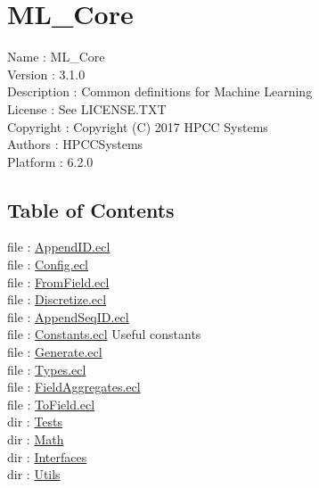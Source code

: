 \chapter*{ML\_Core}
\hypertarget{ecldoc:toc:ML_Core}{}

Name : ML\_Core \\
Version : 3.1.0 \\
Description : Common definitions for Machine Learning \\
License : See LICENSE.TXT \\
Copyright : Copyright (C) 2017 HPCC Systems \\
Authors : HPCCSystems \\
Platform : 6.2.0 \\

\section*{Table of Contents}
file : \hyperlink{ecldoc:toc:ML_Core.AppendID}{AppendID.ecl}   \\
file : \hyperlink{ecldoc:toc:ML_Core.Config}{Config.ecl}   \\
file : \hyperlink{ecldoc:toc:ML_Core.FromField}{FromField.ecl}   \\
file : \hyperlink{ecldoc:toc:ML_Core.Discretize}{Discretize.ecl}   \\
file : \hyperlink{ecldoc:toc:ML_Core.AppendSeqID}{AppendSeqID.ecl}   \\
file : \hyperlink{ecldoc:toc:ML_Core.Constants}{Constants.ecl}  Useful constants \\
file : \hyperlink{ecldoc:toc:ML_Core.Generate}{Generate.ecl}   \\
file : \hyperlink{ecldoc:toc:ML_Core.Types}{Types.ecl}   \\
file : \hyperlink{ecldoc:toc:ML_Core.FieldAggregates}{FieldAggregates.ecl}   \\
file : \hyperlink{ecldoc:toc:ML_Core.ToField}{ToField.ecl}   \\
dir : \hyperlink{ecldoc:toc:ML_Core/Tests}{Tests}   \\
dir : \hyperlink{ecldoc:toc:ML_Core/Math}{Math}   \\
dir : \hyperlink{ecldoc:toc:ML_Core/Interfaces}{Interfaces}   \\
dir : \hyperlink{ecldoc:toc:ML_Core/Utils}{Utils}   \\















